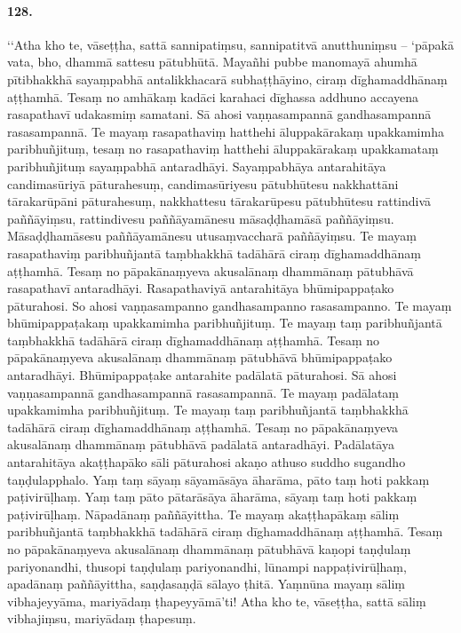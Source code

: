 \paragraph{128.} ‘‘Atha kho te, vāseṭṭha, sattā sannipatiṃsu, sannipatitvā anutthuniṃsu – ‘pāpakā vata, bho, dhammā sattesu pātubhūtā. Mayañhi pubbe manomayā ahumhā pītibhakkhā sayaṃpabhā antalikkhacarā subhaṭṭhāyino, ciraṃ dīghamaddhānaṃ aṭṭhamhā. Tesaṃ no amhākaṃ kadāci karahaci dīghassa addhuno accayena rasapathavī udakasmiṃ samatani. Sā ahosi vaṇṇasampannā gandhasampannā rasasampannā. Te mayaṃ rasapathaviṃ hatthehi āluppakārakaṃ upakkamimha paribhuñjituṃ, tesaṃ no rasapathaviṃ hatthehi āluppakārakaṃ upakkamataṃ paribhuñjituṃ sayaṃpabhā antaradhāyi. Sayaṃpabhāya antarahitāya candimasūriyā pāturahesuṃ, candimasūriyesu pātubhūtesu nakkhattāni tārakarūpāni pāturahesuṃ, nakkhattesu tārakarūpesu pātubhūtesu rattindivā paññāyiṃsu, rattindivesu paññāyamānesu māsaḍḍhamāsā paññāyiṃsu. Māsaḍḍhamāsesu paññāyamānesu utusaṃvaccharā paññāyiṃsu. Te mayaṃ rasapathaviṃ paribhuñjantā taṃbhakkhā tadāhārā ciraṃ dīghamaddhānaṃ aṭṭhamhā. Tesaṃ no pāpakānaṃyeva akusalānaṃ dhammānaṃ pātubhāvā rasapathavī antaradhāyi. Rasapathaviyā antarahitāya bhūmipappaṭako pāturahosi. So ahosi vaṇṇasampanno gandhasampanno rasasampanno. Te mayaṃ bhūmipappaṭakaṃ upakkamimha paribhuñjituṃ. Te mayaṃ taṃ paribhuñjantā taṃbhakkhā tadāhārā ciraṃ dīghamaddhānaṃ aṭṭhamhā. Tesaṃ no pāpakānaṃyeva akusalānaṃ dhammānaṃ pātubhāvā bhūmipappaṭako antaradhāyi. Bhūmipappaṭake antarahite padālatā pāturahosi. Sā ahosi vaṇṇasampannā gandhasampannā rasasampannā. Te mayaṃ padālataṃ upakkamimha paribhuñjituṃ. Te mayaṃ taṃ paribhuñjantā taṃbhakkhā tadāhārā ciraṃ dīghamaddhānaṃ aṭṭhamhā. Tesaṃ no pāpakānaṃyeva akusalānaṃ dhammānaṃ pātubhāvā padālatā antaradhāyi. Padālatāya antarahitāya akaṭṭhapāko sāli pāturahosi akaṇo athuso suddho sugandho taṇḍulapphalo. Yaṃ taṃ sāyaṃ sāyamāsāya āharāma, pāto taṃ hoti pakkaṃ paṭivirūḷhaṃ. Yaṃ taṃ pāto pātarāsāya āharāma, sāyaṃ taṃ hoti pakkaṃ paṭivirūḷhaṃ. Nāpadānaṃ paññāyittha. Te mayaṃ akaṭṭhapākaṃ sāliṃ paribhuñjantā taṃbhakkhā tadāhārā ciraṃ dīghamaddhānaṃ aṭṭhamhā. Tesaṃ no pāpakānaṃyeva akusalānaṃ dhammānaṃ pātubhāvā kaṇopi taṇḍulaṃ pariyonandhi, thusopi taṇḍulaṃ pariyonandhi, lūnampi nappaṭivirūḷhaṃ, apadānaṃ paññāyittha, saṇḍasaṇḍā sālayo ṭhitā. Yaṃnūna mayaṃ sāliṃ vibhajeyyāma, mariyādaṃ ṭhapeyyāmā’ti! Atha kho te, vāseṭṭha, sattā sāliṃ vibhajiṃsu, mariyādaṃ ṭhapesuṃ.

